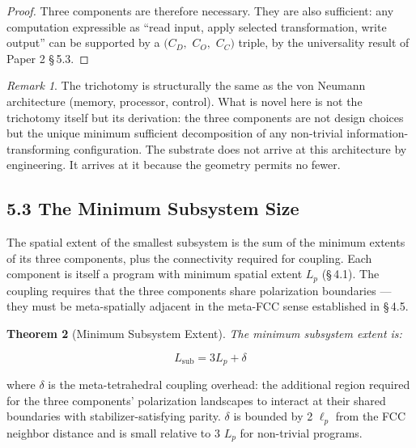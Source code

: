\documentclass[11pt,oneside]{report}
\newtheorem{theorem}{Theorem}[section]
\theoremstyle{definition}
\theoremstyle{remark}
\newtheorem{remark}[theorem]{Remark}
\begin{document}
\begin{proof}
Three components are therefore necessary. They are also sufficient: any
computation expressible as ``read input, apply selected transformation,
write output'' can be supported by a \ensuremath{(C_{D},} \ensuremath{C_{O},} \ensuremath{C_{C})} triple, by the
universality result of Paper 2 \S\,5.3.

\end{proof}

\begin{remark}
The trichotomy is structurally the same as the von Neumann
architecture (memory, processor, control). What is novel here is not the
trichotomy itself but its derivation: the three components are not
design choices but the unique minimum sufficient decomposition of any
non-trivial information-transforming configuration. The substrate does
not arrive at this architecture by engineering. It arrives at it because
the geometry permits no fewer.
\end{remark}

\subsection*{5.3 The Minimum Subsystem Size}

The spatial extent of the smallest subsystem is the sum of the minimum
extents of its three components, plus the connectivity required for
coupling. Each component is itself a program with minimum spatial extent
\ensuremath{L_{p}} (\S\,4.1). The coupling requires that the three components share
polarization boundaries --- they must be meta-spatially adjacent in the
meta-FCC sense established in \S\,4.5.

\begin{theorem}[Minimum Subsystem Extent]
The minimum subsystem extent is:
\end{theorem}

\begin{equation*}
L_{\mathrm{sub}} = 3 L_{p} + \delta
\end{equation*}

where \ensuremath{\delta} is the meta-tetrahedral coupling overhead: the additional region
required for the three components' polarization landscapes to interact
at their shared boundaries with stabilizer-satisfying parity. \ensuremath{\delta} is
bounded by 2 \ensuremath{\ell_{p}} from the FCC neighbor distance and is small relative to
3 \ensuremath{L_{p}} for non-trivial programs.
\end{document}
